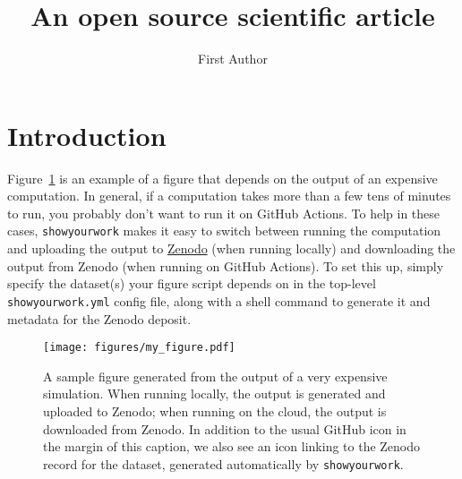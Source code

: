 \documentclass[twocolumn]{aastex631}
\begin{document}
\title{An open source scientific article}

\author{First Author}

\begin{abstract}
    \blindtext
\end{abstract}

\section{Introduction}

Figure~\ref{fig:my_figure} is an example of a figure that depends on the output of an expensive computation.
In general, if a computation takes more than a few tens of minutes to run, you probably don't want to run it on GitHub Actions.
To help in these cases, \texttt{showyourwork} makes it easy to switch between running the computation and uploading the output to \href{https://zenodo.org}{Zenodo} (when running locally) and downloading the output from Zenodo (when running on GitHub Actions).
To set this up, simply specify the dataset(s) your figure script depends on in the top-level \texttt{showyourwork.yml} config file, along with a shell command to generate it and metadata for the Zenodo deposit.

\begin{figure}[ht!]
    \begin{centering}
        \texttt{[image: figures/my\_figure.pdf]}
        \caption{
            A sample figure generated from the output of a very expensive simulation.
            When running locally, the output is generated and uploaded to Zenodo;
            when running on the cloud, the output is downloaded from Zenodo.
            In addition to the usual GitHub icon in the margin of this caption, we also
            see an icon linking to the Zenodo record for the dataset, generated
            automatically by \texttt{showyourwork}.
        }
        \label{fig:my_figure}
    \end{centering}
\end{figure}
\end{document}
